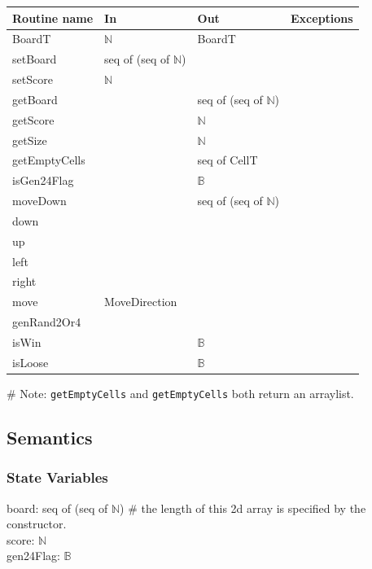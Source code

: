 \documentclass[12pt]{article}
\begin{document}
\begin{tabular}{| l | l | l | l |}
\hline
\textbf{Routine name} & \textbf{In} & \textbf{Out} & \textbf{Exceptions}\\
\hline
BoardT & $\mathbb{N}$ & BoardT & \\
\hline
setBoard & seq of (seq of $\mathbb{N}$) & ~ & \\
\hline
setScore & $\mathbb{N}$ & ~ & \\
\hline
getBoard & ~ & seq of (seq of $\mathbb{N}$) & \\
\hline
getScore & ~ & $\mathbb{N}$ & \\
\hline
getSize & ~ & $\mathbb{N}$ & \\
\hline
getEmptyCells & ~ & seq of CellT & \\
\hline
isGen24Flag & ~ & $\mathbb{B}$ & \\
\hline
moveDown & ~ & seq of (seq of $\mathbb{N}$) & \\ %
\hline
down & ~ & ~ & \\
\hline
up & ~ & ~ & \\
\hline
left & ~ & ~ & \\
\hline
right & ~ & ~ & \\
\hline
move & MoveDirection & ~ & \\
\hline
genRand2Or4 & ~ & ~ & \\
\hline
isWin & ~ & $\mathbb{B}$ & \\
\hline
isLoose & ~ & $\mathbb{B}$ & \\
\hline




\end{tabular}

\noindent
\# Note:  \verb|getEmptyCells| and \verb|getEmptyCells| both return an arraylist.

\subsection* {Semantics}

\subsubsection* {State Variables}

board: seq of (seq of $\mathbb{N}$) \# the length of this 2d array is specified by the constructor.\\
score: $\mathbb{N}$ \\
gen24Flag: $\mathbb{B}$ \\
\end{document}
